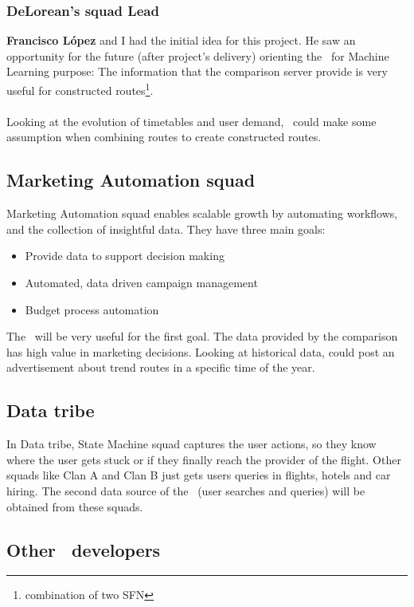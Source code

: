 \subsubsection*{DeLorean's squad Lead}

\textbf{Francisco López} and I had the initial idea for this project. He saw an opportunity for the future (after project's delivery) orienting the \thesis\ for Machine Learning purpose: The information that the comparison server provide is very useful for constructed routes\footnote{combination of two SFN }.
\\\\
Looking at the evolution of timetables and user demand, \squad\ could make some assumption when combining routes to create constructed routes.

\subsection{Marketing Automation squad} \label{mas}

Marketing Automation squad enables scalable growth by automating workflows, and the collection of insightful data. They have three main goals:

\begin{itemize}
  \item Provide data to support decision making
  \item Automated, data driven campaign management
  \item Budget process automation
\end{itemize}

The \thesis\ will be very useful for the first goal. The data provided by the comparison has high value in marketing decisions. Looking at historical data,  could post an advertisement about trend routes in a specific time of the year.

\subsection{Data tribe}

In Data tribe, State Machine squad captures the user actions, so they know where the user gets stuck or if they finally reach the provider of the flight. Other squads like Clan A and Clan B just gets users queries in flights, hotels and car hiring. The second data source of the \thesis\ (user searches and queries) will be obtained from these squads.

\subsection{Other \company\ developers}

